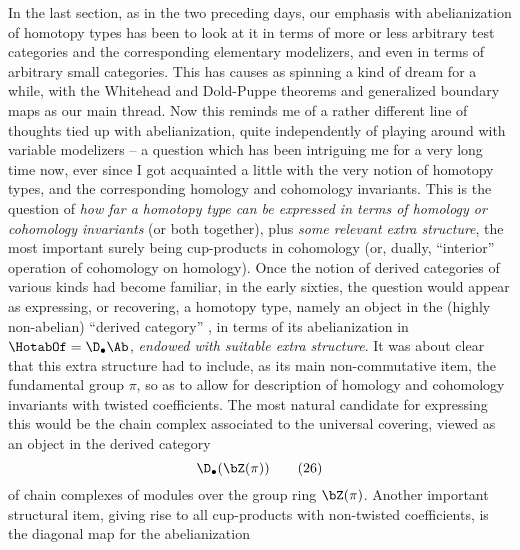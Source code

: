 \label{sec:94}%
In the last section, as in the two preceding days, our emphasis with
abelianization of homotopy types has been to look at it in terms of
more or less arbitrary test categories and the corresponding
elementary modelizers, and even in terms of arbitrary small
categories. This has causes as spinning a kind of dream for a while,
with the Whitehead and Dold-Puppe theorems and generalized boundary
maps as our main thread. Now this reminds me of a rather different
line of thoughts tied up with abelianization, quite independently of
playing around with variable modelizers -- a question which has been
intriguing me for a very long time now, ever since I got acquainted a
little with the very notion of homotopy types, and the corresponding
homology and cohomology invariants. This is the question
of \emph{how far a homotopy type can be expressed in terms of homology
  or cohomology invariants} (or both together), plus \emph{some
  relevant extra structure}, the most important surely being
cup-products in cohomology (or, dually, ``interior'' operation of
cohomology on homology). Once the notion of derived
categories of various kinds had become familiar, in the early sixties,
the question would appear as expressing, or recovering, a homotopy
type, namely an object in the (highly non-abelian) ``derived
category'' \Hot, in terms of its abelianization in
$\HotabOf=\D_\bullet\Ab$, \emph{endowed with suitable extra
  structure}. It was about clear that this extra structure had to
include, as its main non-commutative item, the fundamental group
$\pi$, so as to allow for description of homology and cohomology
invariants with twisted coefficients. The most natural candidate for
expressing this would be the chain complex associated to the universal
covering, viewed as an object in the derived category
\begin{equation}
  \label{eq:94.26}
  \D_\bullet(\bZ(\pi))\tag{26}
\end{equation}
of chain complexes of modules over the group ring $\bZ(\pi)$. Another
important structural item, giving rise to all cup-products with
non-twisted coefficients, is the diagonal map for the abelianization
